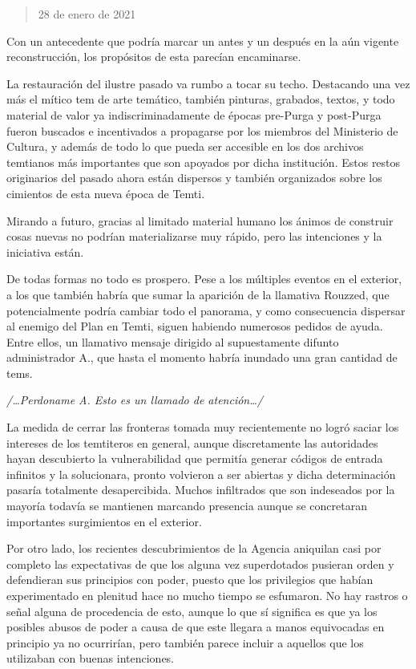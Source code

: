 \documentclass[
  spanish,
]{book}
\begin{document}
\begin{quote}
28 de enero de 2021
\end{quote}

Con un antecedente que podría marcar un antes y un después en la aún vigente reconstrucción, los propósitos de esta parecían encaminarse.

La restauración del ilustre pasado va rumbo a tocar su techo. Destacando una vez más el mítico tem de arte temático, también pinturas, grabados, textos, y todo material de valor ya indiscriminadamente de épocas pre-Purga y post-Purga fueron buscados e incentivados a propagarse por los miembros del Ministerio de Cultura, y además de todo lo que pueda ser accesible en los dos archivos temtianos más importantes que son apoyados por dicha institución. Estos restos originarios del pasado ahora están dispersos y también organizados sobre los cimientos de esta nueva época de Temti.

Mirando a futuro, gracias al limitado material humano los ánimos de construir cosas nuevas no podrían materializarse muy rápido, pero las intenciones y la iniciativa están.

De todas formas no todo es prospero. Pese a los múltiples eventos en el exterior, a los que también habría que sumar la aparición de la llamativa Rouzzed, que potencialmente podría cambiar todo el panorama, y como consecuencia dispersar al enemigo del Plan en Temti, siguen habiendo numerosos pedidos de ayuda. Entre ellos, un llamativo mensaje dirigido al supuestamente difunto administrador A., que hasta el momento habría inundado una gran cantidad de tems.

\emph{/\ldots Perdoname A. Esto es un llamado de atención\ldots/}

La medida de cerrar las fronteras tomada muy recientemente no logró saciar los intereses de los temtiteros en general, aunque discretamente las autoridades hayan descubierto la vulnerabilidad que permitía generar códigos de entrada infinitos y la solucionara, pronto volvieron a ser abiertas y dicha determinación pasaría totalmente desapercibida. Muchos infiltrados que son indeseados por la mayoría todavía se mantienen marcando presencia aunque se concretaran importantes surgimientos en el exterior.

Por otro lado, los recientes descubrimientos de la Agencia aniquilan casi por completo las expectativas de que los alguna vez superdotados pusieran orden y defendieran sus principios con poder, puesto que los privilegios que habían experimentado en plenitud hace no mucho tiempo se esfumaron. No hay rastros o señal alguna de procedencia de esto, aunque lo que sí significa es que ya los posibles abusos de poder a causa de que este llegara a manos equivocadas en principio ya no ocurrirían, pero también parece incluir a aquellos que los utilizaban con buenas intenciones.
\end{document}
